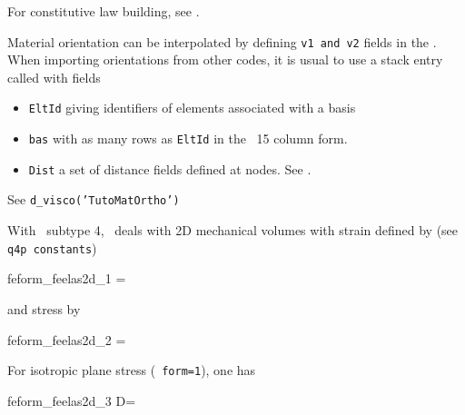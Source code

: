 For constitutive law building, see \psolid. 

Material orientation can be interpolated by defining {\tt v1 and v2} fields in the . When importing orientations from other codes, it is usual to use a \hypertarget{var.EltOrient}{stack entry} called  with fields

\begin{itemize}
\item {\tt EltId} giving identifiers of elements associated with a basis 
\item {\tt bas} with as many rows as {\tt EltId} in the \basis\ 15 column form.
\item {\tt Dist} a set of distance fields defined at nodes. See .
\end{itemize}

See {\tt d\_visco('TutoMatOrtho')}




With \melastic\ subtype 4, \psolid\ deals with 2D mechanical volumes with strain defined by (see {\tt q4p constants})

\begin{eqsvg}{feform_feelas2d_1}
=
\end{eqsvg}
%
and stress by
%
\begin{eqsvg}{feform_feelas2d_2}
=
\end{eqsvg}

For isotropic plane stress (\psolid\ {\tt form=1}), one has

\begin{eqsvg}{feform_feelas2d_3}
D=
\end{eqsvg}

